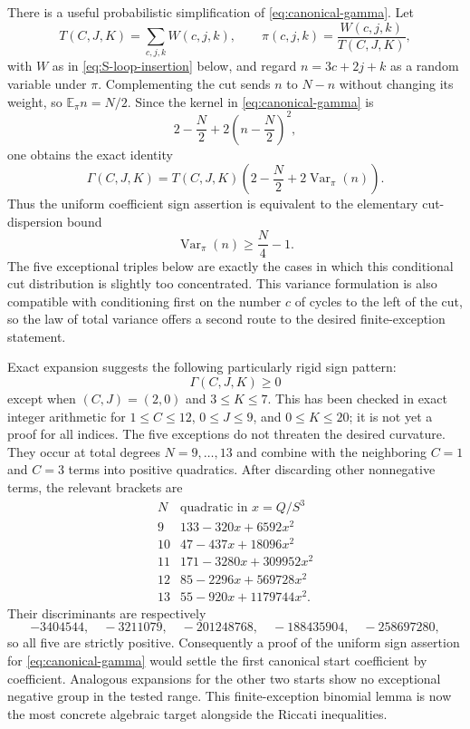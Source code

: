 \documentclass[11pt]{article}
\newcommand{\E}{\mathbb E}
\theoremstyle{remark}
\begin{document}
There is a useful probabilistic simplification of
\eqref{eq:canonical-gamma}.  Let
\[
 T(C,J,K)=\sum_{c,j,k}W(c,j,k),
 \qquad
 \pi(c,j,k)=\frac{W(c,j,k)}{T(C,J,K)},
\]
with $W$ as in \eqref{eq:S-loop-insertion} below, and regard
$n=3c+2j+k$ as a random variable under $\pi$.  Complementing the cut sends
$n$ to $N-n$ without changing its weight, so $\E_\pi n=N/2$.  Since the
kernel in \eqref{eq:canonical-gamma} is
\[
 2-\frac N2+2\left(n-\frac N2\right)^2,
\]
one obtains the exact identity
\begin{equation}\label{eq:canonical-cut-variance}
 \Gamma(C,J,K)=T(C,J,K)
 \left(2-\frac N2+2\operatorname{Var}_\pi(n)\right).
\end{equation}
Thus the uniform coefficient sign assertion is equivalent to the elementary
cut-dispersion bound
\begin{equation}\label{eq:canonical-cut-variance-target}
 \operatorname{Var}_\pi(n)\geq\frac N4-1.
\end{equation}
The five exceptional triples below are exactly the cases in which this
conditional cut distribution is slightly too concentrated.  This variance
formulation is also compatible with conditioning first on the number $c$ of
cycles to the left of the cut, so the law of total variance offers a second
route to the desired finite-exception statement.

Exact expansion suggests the following particularly rigid sign pattern:
\[
 \Gamma(C,J,K)\geq0
\]
except when $(C,J)=(2,0)$ and $3\leq K\leq7$.  This has been checked in
exact integer arithmetic for
$1\leq C\leq12$, $0\leq J\leq9$, and $0\leq K\leq20$; it is not yet a
proof for all indices.  The five exceptions do not threaten the desired
curvature.  They occur at total degrees $N=9,\ldots,13$ and combine with
the neighboring $C=1$ and $C=3$ terms into positive quadratics.  After
discarding other nonnegative terms, the relevant brackets are
\[
\begin{array}{c|c}
N&\text{quadratic in }x=Q/S^3\\ \hline
9&133-320x+6592x^2\\
10&47-437x+18096x^2\\
11&171-3280x+309952x^2\\
12&85-2296x+569728x^2\\
13&55-920x+1179744x^2.
\end{array}
\]
Their discriminants are respectively
\[
 -3404544,\quad -3211079,\quad -201248768,\quad
 -188435904,\quad -258697280,
\]
so all five are strictly positive.  Consequently a proof of the uniform
sign assertion for \eqref{eq:canonical-gamma} would settle the first
canonical start coefficient by coefficient.  Analogous expansions for the
other two starts show no exceptional negative group in the tested range.
This finite-exception binomial lemma is now the most concrete algebraic
target alongside the Riccati inequalities.
\end{document}
